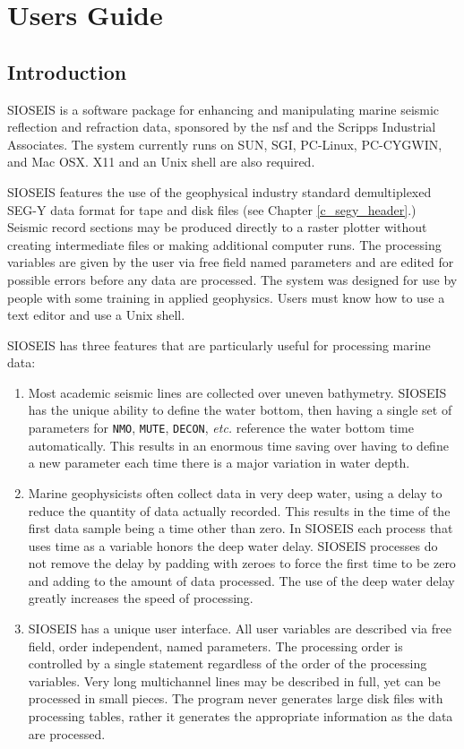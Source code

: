 \part{Users Guide}
\chapter{Introduction}

SIOSEIS is a software package for enhancing and manipulating marine
seismic reflection and refraction data, sponsored by the \gls{nsf}
and the Scripps Industrial Associates.
The system currently runs on SUN, SGI, PC-Linux, PC-CYGWIN, and Mac OSX.
X11 and an Unix shell are also required.

SIOSEIS features the use of the geophysical industry standard
demultiplexed SEG-Y data format for tape and disk files
(see Chapter \ref{c_segy_header}.) Seismic record
sections may be produced directly to a raster plotter without creating
intermediate files or making additional computer runs.  The processing
variables are given by the user via free field named parameters and are
edited for possible errors before any data are processed.  The system was
designed for use by people with some training in applied geophysics.
Users must know how to use a text editor and use a Unix shell.

SIOSEIS has three features that are particularly useful for processing
marine data:

\begin{enumerate}
\item Most academic seismic lines are collected over uneven bathymetry.
      SIOSEIS has the unique ability to define the water bottom, then
      having a single set of parameters for \texttt{NMO}, \texttt{MUTE}, \texttt{DECON}, \textit{etc.}
      reference the water bottom time automatically.  This results in an
      enormous time saving over having to define a new parameter each
      time there is a major variation in water depth.

\item Marine geophysicists often collect data in very deep water, using a
      delay to reduce the quantity of data actually recorded.  This
      results in the time of the  first data sample being a time other
      than zero.  In SIOSEIS each process that uses time as a variable
      honors the deep water delay.  SIOSEIS processes do not remove the
      delay by padding with zeroes to force the first time to be zero and
      adding to the amount of data processed.  The use of the deep water
      delay greatly increases the speed of processing.

\item SIOSEIS has a unique user interface.  All user variables are
      described via free field, order independent, named parameters.  The
      processing order is controlled by a single statement regardless of
      the order of the processing variables.  Very long multichannel lines
      may be described in full, yet can be processed in small pieces.  The
      program never generates large disk files with processing tables,
      rather it generates the appropriate information as the data are
      processed.
\end{enumerate}

